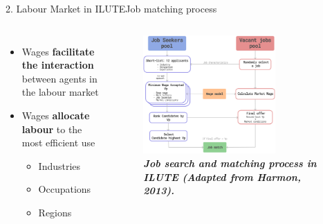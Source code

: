 \documentclass[aspectratio=169]{beamer}
\begin{document}
\begin{frame}{2. Labour Market in ILUTE}{Job matching process}
    \vspace*{-25pt}
    \begin{columns}
            \begin{itemize}
                \setlength{\itemsep}{10pt} %
                \item \fontsize{9pt}{9pt}\selectfont Wages \textbf{facilitate the interaction} between agents in the labour market
                \item \fontsize{9pt}{9pt}\selectfont Wages \textbf{allocate labour} to the most efficient use
                \begin{itemize}
                    \item \fontsize{9pt}{9pt}\selectfont Industries
                    \item \fontsize{9pt}{9pt}\selectfont Occupations
                    \item \fontsize{9pt}{9pt}\selectfont Regions
                \end{itemize}
            \end{itemize}
            \begin{figure}
                \centering
                \includegraphics[width=0.72\textwidth]{./images/job_matching.png}
                \captionsetup{labelformat=empty}
                \caption{\fontsize{8pt}{8pt}\selectfont \textbf{\textit{Job search and matching process in ILUTE (Adapted from Harmon, 2013).}}}
            \end{figure}
    \end{columns}
\end{frame}
\end{document}
